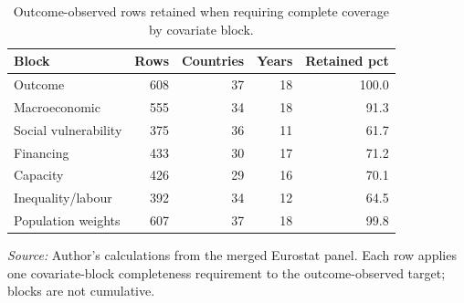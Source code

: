 \begin{table}[H]
\centering
\small
\caption{Outcome-observed rows retained when requiring complete coverage by covariate block.}
\label{tab:attrition_by_covariate_block}
\begin{tabular}{@{}lrrrr@{}}
\toprule
Block & Rows & Countries & Years & Retained pct \\
\midrule
Outcome & 608 & 37 & 18 & 100.0 \\
Macroeconomic & 555 & 34 & 18 & 91.3 \\
Social vulnerability & 375 & 36 & 11 & 61.7 \\
Financing & 433 & 30 & 17 & 71.2 \\
Capacity & 426 & 29 & 16 & 70.1 \\
Inequality/labour & 392 & 34 & 12 & 64.5 \\
Population weights & 607 & 37 & 18 & 99.8 \\
\bottomrule
\end{tabular}

\vspace{0.2em}
\begin{minipage}{0.92\textwidth}\scriptsize \textit{Source:} Author's calculations from the merged Eurostat panel. Each row applies one covariate-block completeness requirement to the outcome-observed target; blocks are not cumulative.\end{minipage}
\end{table}
